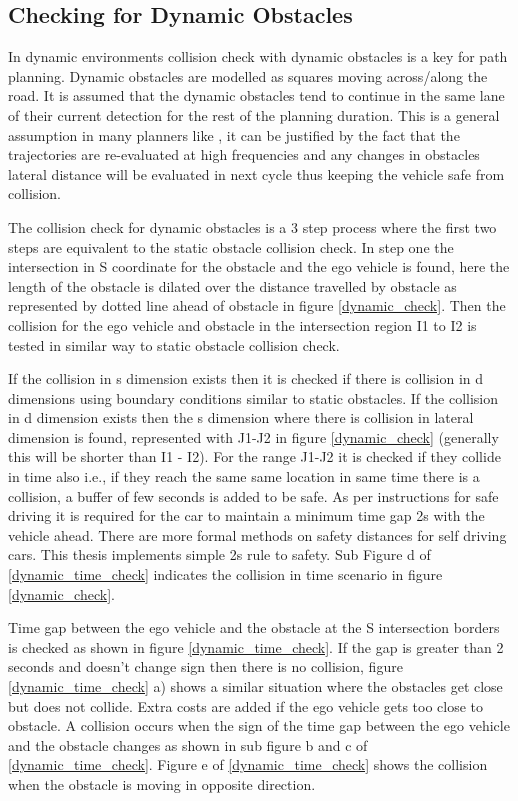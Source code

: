 \subsection{Checking for Dynamic Obstacles} \label{obstacle_check_dynamic}

In dynamic environments collision check with dynamic obstacles is a key for path planning. Dynamic obstacles are modelled as squares moving across/along the road. It is assumed that the dynamic obstacles tend to continue in the same lane of their current detection for the rest of the planning duration. This is a general assumption in many planners like \cite{unit_A_star}, it can be justified by the fact that the trajectories are re-evaluated at high frequencies and any changes in obstacles lateral distance will be evaluated in next cycle thus keeping the vehicle safe from collision. 

The collision check for dynamic obstacles is a 3 step process where the first two steps are equivalent to the static obstacle collision check. In step one the intersection in S coordinate for the obstacle and the ego vehicle is found, here the length of the obstacle is dilated over the distance travelled by obstacle as represented by dotted line ahead of obstacle in figure \ref{dynamic_check}. Then the collision for the ego vehicle and obstacle in the intersection region I1 to I2 is tested in similar way to static obstacle collision check. 

If the collision in s dimension exists then it is checked if there is collision in d dimensions using boundary conditions similar to static obstacles. If the collision in d dimension exists then the s dimension where there is collision in lateral dimension is found, represented with J1-J2 in figure \ref{dynamic_check} (generally this will be shorter than I1 - I2). For the range J1-J2 it is checked if they collide in time also i.e., if they reach the same same location in same time there is a collision, a buffer of few seconds is added to be safe. As per instructions for safe driving it is required for the car to maintain a minimum time gap 2s with the vehicle ahead. There are more formal methods \cite{mobile_eye_safety_distance} on safety distances for self driving cars. This thesis implements simple 2s rule to safety. Sub Figure d of \ref{dynamic_time_check} indicates the collision in time scenario in figure \ref{dynamic_check}.

Time gap between the ego vehicle and the obstacle at the S intersection borders is checked as shown in figure \ref{dynamic_time_check}. If the gap is greater than 2 seconds and doesn't change sign then there is no collision, figure \ref{dynamic_time_check} a) shows a similar situation where the obstacles get close but does not collide. Extra costs are added if the ego vehicle gets too close to obstacle. A collision occurs when the sign of the time gap between the ego vehicle and the obstacle changes as shown in sub figure b and c of \ref{dynamic_time_check}. Figure e of \ref{dynamic_time_check} shows the collision when the obstacle is moving in opposite direction. 

